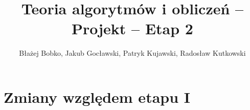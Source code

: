 \documentclass{../llncs_template/llncs}
\begin{document}
\title{Teoria algorytmów i obliczeń -- Projekt -- Etap 2}
\author{Błażej Bobko, Jakub Gocławski, Patryk Kujawski, Radosław Kutkowski}
\maketitle 

\section{Zmiany względem etapu I}
\end{document}
